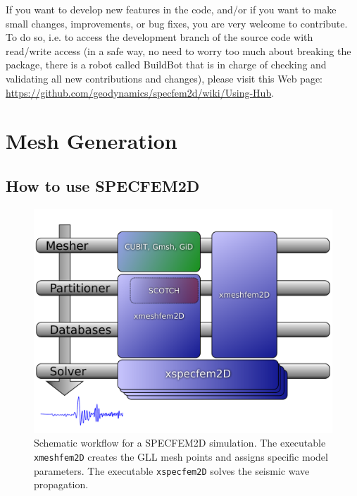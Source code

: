 \documentclass[oneside,english,onecolumn,letterpaper]{book}
\begin{document}
If you want to develop new features in the code, and/or if you want to make small changes, improvements, or bug fixes, you are very welcome to contribute. To do so, i.e. to access the development branch of the source code with read/write access (in a safe way, no need to worry too much about breaking the package, there is a robot called BuildBot that is in charge of checking and validating all new contributions and changes), please visit this Web page: \url{https://github.com/geodynamics/specfem2d/wiki/Using-Hub}.


\chapter{Mesh Generation}


\section{How to use SPECFEM2D}

\begin{figure}[htbp]
\centering
\includegraphics[width=.6\textwidth]{figures/workflow}

\caption{Schematic workflow for a SPECFEM2D simulation. The executable \texttt{xmeshfem2D} creates the GLL mesh points and assigns specific model parameters. The executable \texttt{xspecfem2D} solves the seismic wave propagation.}

\label{fig:workflow.databases}
\end{figure}
\end{document}
